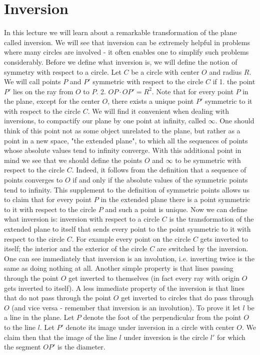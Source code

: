 \chapter{Inversion}
In this lecture we will learn about a remarkable transformation of the plane called inversion. We will see that inversion can be extremely helpful in problems where many circles are involved - it often enables one to simplify such problems considerably.
Before we define what inversion is, we will define the notion of symmetry with respect to a circle.
Let $C$ be a circle with center $O$ and radius $R$. We will call points $P$ and $P'$ symmetric with respect to the circle $C$ if
1. the point $P'$ lies on the ray from $O$ to $P$.
2. $OP\cdot OP'=R^2$.
Note that for every point $P$ in the plane, except for the center $O$, there exists a unique point $P'$ symmetric to it with respect to the circle $C$.
We will find it convenient when dealing with inversions, to compactify our plane by one point at infinity, called $\infty$. One should think of this point not as some object unrelated to the plane, but rather as a point in a new space, "the extended plane", to which all the sequences of points whose absolute values tend to infinity converge.
With this additional point in mind we see that we should define the points $O$ and $\infty$ to be symmetric with respect to the circle $C$. Indeed, it follows from the definition that a sequence of points converges to $O$ if and only if the absolute values of the symmetric points tend to infinity.
This supplement to the definition of symmetric points allows us to claim that for every point $P$ in the extended plane there is a point symmetric to it with respect to the circle $P$ and such a point is unique.
Now we can define what inversion is: inversion with respect to a circle $C$ is the transformation of the extended plane to itself that sends every point to the point symmetric to it with respect to the circle $C$.
For example every point on the circle $C$ gets inverted to itself; the interior and the exterior of the circle $C$ are switched by the inversion.
One can see immediately that inversion is an involution, i.e. inverting twice is the same as doing nothing at all.
Another simple property is that lines passing through the point $O$ get inverted to themselves (in fact every ray with origin $O$ gets inverted to itself).
A less immediate property of the inversion is that lines that do not pass through the point $O$ get inverted to circles that do pass through $O$ (and vice versa - remember that inversion is an involution).
To prove it let $l$ be a line in the plane. Let $P$ denote the foot of the perpendicular from the point $O$ to the line $l$. Let $P'$ denote its image under inversion in a circle with center $O$. We claim then that the image of the line $l$ under inversion is the circle $l'$ for which the segment $OP'$ is the diameter.
